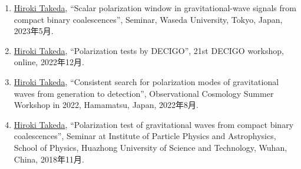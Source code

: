 \documentclass[uplatex, 11pt]{jsarticle}
\begin{document}
\begin{enumerate}
\item \uline{Hiroki Takeda}, “Scalar polarization window in gravitational-wave signals from compact binary coalescences”, Seminar, Waseda University, Tokyo, Japan, 2023年5月.
\item \uline{Hiroki Takeda}, “Polarization tests by DECIGO”, 21st DECIGO workshop, online, 2022年12月.
\item \uline{Hiroki Takeda}, “Consistent search for polarization modes of gravitational waves from generation to detection”, Observational Cosmology Summer Workshop in 2022, Hamamatsu, Japan, 2022年8月.
\item \uline{Hiroki Takeda}, “Polarization test of gravitational waves from compact binary coalescences”, Seminar at Institute of Particle Physics and Astrophysics, School of Physics, Huazhong University of Science and Technology, Wuhan, China, 2018年11月.
\end{enumerate}
\end{document}
